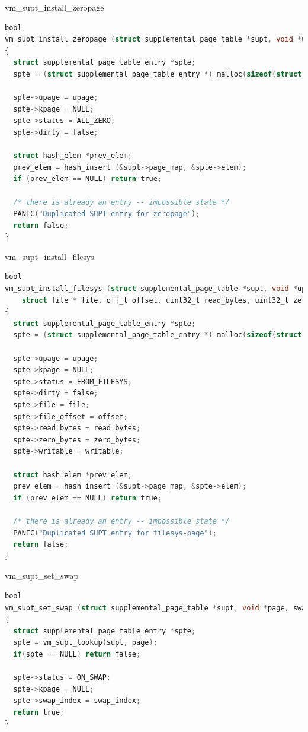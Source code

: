 \documentclass[10pt]{beamer}
\begin{document}
\begin{frame}[fragile]{vm\_supt\_install\_zeropage}
\begin{lstlisting}[language=C]
bool
vm_supt_install_zeropage (struct supplemental_page_table *supt, void *upage)
{
  struct supplemental_page_table_entry *spte;
  spte = (struct supplemental_page_table_entry *) malloc(sizeof(struct supplemental_page_table_entry));

  spte->upage = upage;
  spte->kpage = NULL;
  spte->status = ALL_ZERO;
  spte->dirty = false;

  struct hash_elem *prev_elem;
  prev_elem = hash_insert (&supt->page_map, &spte->elem);
  if (prev_elem == NULL) return true;

  /* there is already an entry -- impossible state */
  PANIC("Duplicated SUPT entry for zeropage");
  return false;
}
\end{lstlisting}
\end{frame}
\begin{frame}[fragile]{vm\_supt\_install\_filesys}
\begin{lstlisting}[language=C]
bool
vm_supt_install_filesys (struct supplemental_page_table *supt, void *upage,
    struct file * file, off_t offset, uint32_t read_bytes, uint32_t zero_bytes, bool writable)
{
  struct supplemental_page_table_entry *spte;
  spte = (struct supplemental_page_table_entry *) malloc(sizeof(struct supplemental_page_table_entry));

  spte->upage = upage;
  spte->kpage = NULL;
  spte->status = FROM_FILESYS;
  spte->dirty = false;
  spte->file = file;
  spte->file_offset = offset;
  spte->read_bytes = read_bytes;
  spte->zero_bytes = zero_bytes;
  spte->writable = writable;

  struct hash_elem *prev_elem;
  prev_elem = hash_insert (&supt->page_map, &spte->elem);
  if (prev_elem == NULL) return true;

  /* there is already an entry -- impossible state */
  PANIC("Duplicated SUPT entry for filesys-page");
  return false;
}
\end{lstlisting}
\end{frame}
\begin{frame}[fragile]{vm\_supt\_set\_swap}
\begin{lstlisting}[language=C]
bool
vm_supt_set_swap (struct supplemental_page_table *supt, void *page, swap_index_t swap_index)
{
  struct supplemental_page_table_entry *spte;
  spte = vm_supt_lookup(supt, page);
  if(spte == NULL) return false;

  spte->status = ON_SWAP;
  spte->kpage = NULL;
  spte->swap_index = swap_index;
  return true;
}
\end{lstlisting}
\end{frame}
\end{document}
